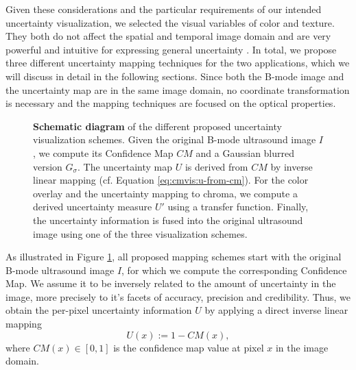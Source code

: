 Given these considerations and the particular requirements of our intended uncertainty visualization, we selected the visual variables of color and texture.
They both do not affect the spatial and temporal image domain and are very powerful and intuitive for expressing general uncertainty \cite{MacEachren:2012:VisualSemiotics}.
In total, we propose three different uncertainty mapping techniques for the two applications, which we will discuss in detail in the following sections.
Since both the B-mode image and the uncertainty map are in the same image domain, no coordinate transformation is necessary and the mapping techniques are focused on the optical properties.

\begin{figure}[ht]
	\centering
	
	\caption{
		\textbf{Schematic diagram} of the different proposed uncertainty visualization schemes.
		Given the original B-mode ultrasound image $I$, we compute its Confidence Map $CM$ and a Gaussian blurred version $G_\sigma$. 
		The uncertainty map $U$ is derived from $CM$ by inverse linear mapping (cf. Equation \ref{eq:cmvis:u-from-cm}). 
		For the color overlay and the uncertainty mapping to chroma, we compute a derived uncertainty measure $U'$ using a transfer function. 
		Finally, the uncertainty information is fused into the original ultrasound image using one of the three visualization schemes.
	}
	\label{fig:cmvis:schematic-diagram}
\end{figure}

As illustrated in Figure \ref{fig:cmvis:schematic-diagram}, all proposed mapping schemes start with the original B-mode ultrasound image $I$, for which we compute the corresponding Confidence Map.
We assume it to be inversely related to the amount of uncertainty in the image, more precisely to it's facets of accuracy, precision and credibility.
Thus, we obtain the per-pixel uncertainty information $U$ by applying a direct inverse linear mapping
\begin{equation}
	\label{eq:cmvis:u-from-cm}
	U(x) := 1 - CM(x),
\end{equation}
where $CM(x) \in [0,1]$ is the confidence map value at pixel $x$ in the image domain.


